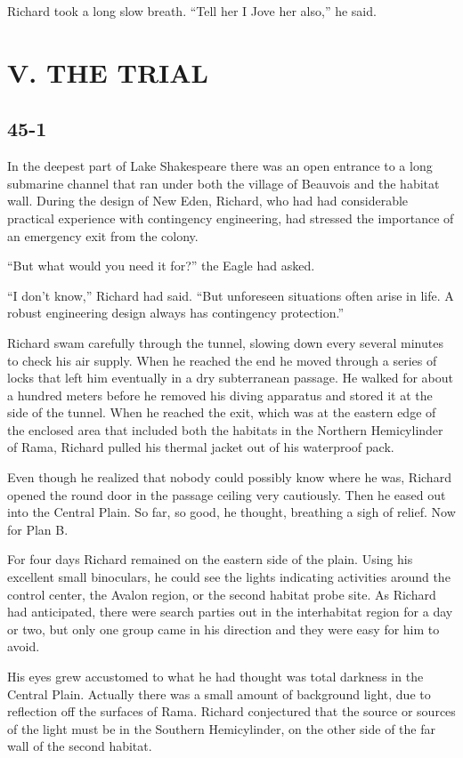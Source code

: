 \documentclass[]{article}
\begin{document}
{Richard took a long slow breath.  “Tell her I Jove her also,” he said.


\section{V.  THE TRIAL}

\subsection*{45-1}

In the deepest part of Lake Shakespeare there was an open entrance to a long submarine channel that ran under both the village of Beauvois and the habitat wall.  During the design of New Eden, Richard, who had had considerable practical experience with contingency engineering, had stressed the importance of an emergency exit from the colony.

“But what would you need it for?” the Eagle had asked.

“I don’t know,” Richard had said.  “But unforeseen situations often arise in life.  A robust engineering design always has contingency protection.”

Richard swam carefully through the tunnel, slowing down every several minutes to check his air supply.  When he reached the end he moved through a series of locks that left him eventually in a dry subterranean passage.  He walked for about a hundred meters before he removed his diving apparatus and stored it at the side of the tunnel.  When he reached the exit, which was at the eastern edge of the enclosed area that included both the habitats in the Northern Hemicylinder of Rama, Richard pulled his thermal jacket out of his waterproof pack.

Even though he realized that nobody could possibly know where he was, Richard opened the round door in the passage ceiling very cautiously.  Then he eased out into the Central Plain.  So far, so good, he thought, breathing a sigh of relief.  Now for Plan B.

For four days Richard remained on the eastern side of the plain.  Using his excellent small binoculars, he could see the lights indicating activities around the control center, the Avalon region, or the second habitat probe site.  As Richard had anticipated, there were search parties out in the interhabitat region for a day or two, but only one group came in his direction and they were easy for him to avoid.

His eyes grew accustomed to what he had thought was total darkness in the Central Plain.  Actually there was a small amount of background light, due to reflection off the surfaces of Rama.  Richard conjectured that the source or sources of the light must be in the Southern Hemicylinder, on the other side of the far wall of the second habitat.

}
\end{document}
